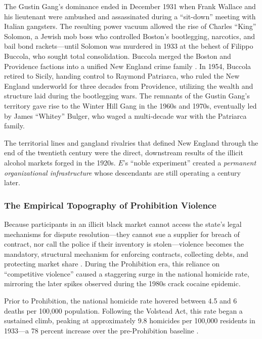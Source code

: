 The Gustin Gang's dominance ended in December 1931 when Frank Wallace and his lieutenant were ambushed and assassinated during a ``sit-down'' meeting with Italian gangsters. The resulting power vacuum allowed the rise of Charles ``King'' Solomon, a Jewish mob boss who controlled Boston's bootlegging, narcotics, and bail bond rackets---until Solomon was murdered in 1933 at the behest of Filippo Buccola, who sought total consolidation. Buccola merged the Boston and Providence factions into a unified New England crime family \cite{wikipedia_patriarca, mobmuseum_patriarca}. In 1954, Buccola retired to Sicily, handing control to Raymond Patriarca, who ruled the New England underworld for three decades from Providence, utilizing the wealth and structure laid during the bootlegging wars. The remnants of the Gustin Gang's territory gave rise to the Winter Hill Gang in the 1960s and 1970s, eventually led by James ``Whitey'' Bulger, who waged a multi-decade war with the Patriarca family.

The territorial lines and gangland rivalries that defined New England through the end of the twentieth century were the direct, downstream results of the illicit alcohol markets forged in the 1920s. $E$'s ``noble experiment'' created a \textit{permanent organizational infrastructure} whose descendants are still operating a century later.

\subsubsection{The Empirical Topography of Prohibition Violence}

Because participants in an illicit black market cannot access the state's legal mechanisms for dispute resolution---they cannot sue a supplier for breach of contract, nor call the police if their inventory is stolen---violence becomes the mandatory, structural mechanism for enforcing contracts, collecting debts, and protecting market share \cite{hoplofobia_prohibition}. During the Prohibition era, this reliance on ``competitive violence'' caused a staggering surge in the national homicide rate, mirroring the later spikes observed during the 1980s crack cocaine epidemic.

Prior to Prohibition, the national homicide rate hovered between 4.5 and 6 deaths per 100,000 population. Following the Volstead Act, this rate began a sustained climb, peaking at approximately 9.8 homicides per 100,000 residents in 1933---a 78 percent increase over the pre-Prohibition baseline \cite{bjs_homicide, cdc_homicide}.

